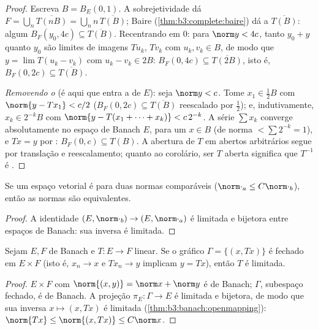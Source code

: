 \begin{proof}
Escreva $B = B_E(0,1)$. A sobrejetividade dá $F = \bigcup_n
\overline{T(nB)} = \bigcup_n n\,\overline{T(B)}$; Baire (\cref{thm:b3:complete:baire}) dá
 a $\overline{T(B)}$: algum $B_F(y_0, 4c) \subseteq
\overline{T(B)}$. Recentrando em $0$: para $\norm y < 4c$, tanto
$y_0 + y$ quanto $y_0$ são limites de imagens $Tu_k$, $Tv_k$ com
$u_k, v_k \in B$, de modo que $y = \lim T(u_k - v_k)$ com $u_k - v_k
\in 2B$: $B_F(0, 4c) \subseteq \overline{T(2B)}$, isto é, $B_F(0, 2c) \subseteq \overline{T(B)}$.

\emph{Removendo o } (é aqui que entra a  de $E$):
seja $\norm y < c$. Tome $x_1 \in \frac12 B$ com $\norm{y -
Tx_1} < c/2$ ($B_F(0,2c) \subseteq \overline{T(B)}$ reescalado por $\frac12$); e,
indutivamente, $x_k \in 2^{-k}B$ com $\norm{y -
T(x_1 + \dots + x_k)} < c\,2^{-k}$. A série $\sum x_k$ converge absolutamente no
espaço de Banach $E$, para um $x \in B$ (de norma $<
\sum 2^{-k} = 1$), e $Tx = y$
por : $B_F(0, c)
\subseteq T(B)$. A abertura de $T$ em abertos arbitrários
segue por translação e reescalamento; quanto ao corolário, ser $T$
aberta significa que $T^{-1}$ é .
\end{proof}

\begin{corollary}\label{cor:b3:banach:equivnorms}
Se um espaço vetorial é  para duas normas comparáveis ($\norm\cdot_a \leq C\norm\cdot_b$),
então as normas são equivalentes.
\end{corollary}

\begin{proof}
A identidade $(E, \norm\cdot_b) \to (E, \norm\cdot_a)$ é limitada e bijetora entre espaços de Banach: sua
inversa é limitada.
\end{proof}

\begin{theorem}\label{thm:b3:banach:closedgraph}
Sejam $E, F$ de Banach e $T \colon E \to F$ linear. Se o gráfico $\Gamma = \{(x, Tx)\}$ é fechado
em $E \times F$ (isto é, $x_n \to x$ e $Tx_n \to y$ implicam $y = Tx$), então $T$ é
limitada.
\end{theorem}

\begin{proof}
$E \times F$ com $\norm{(x,y)} = \norm x + \norm y$ é de Banach; $\Gamma$, subespaço fechado, é de
Banach. A projeção $\pi_E\colon \Gamma \to E$ é limitada e bijetora, de modo que sua inversa
$x \mapsto (x, Tx)$ é limitada (\cref{thm:b3:banach:openmapping}): $\norm{Tx} \leq \norm{(x,
Tx)} \leq C\norm x$.
\end{proof}

